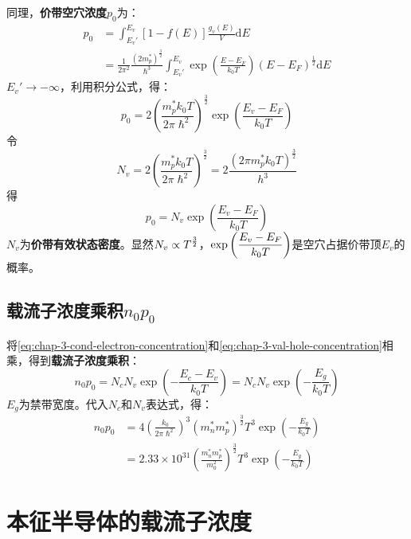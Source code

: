 同理，\textbf{价带空穴浓度}$p_0$为：
\begin{align}
    p_0&=\int_{E_v'}^{E_v}\left[1-f(E)\right]\frac{g_v(E)}{V}\mathrm{d}E\\
    &=\frac{1}{2\pi^2}\frac{(2m_p^*)^\frac{3}{2}}{\hslash^3}\int_{E_v'}^{E_v}\exp{\left(\frac{E-E_F}{k_0T}\right)}\left(E-E_F\right)^\frac{1}{2}\mathrm{d}E
\end{align}
$E_v'\rightarrow -\infty$，利用积分公式，得：
\begin{equation}
    p_0=2\left(\frac{m_p^* k_0T}{2\pi\hslash^2}\right)^\frac{3}{2}\exp{\left(\frac{E_v-E_F}{k_0T}\right)}
\end{equation}
令\begin{equation}
    N_v=2\left(\frac{m_p^* k_0T}{2\pi\hslash^2}\right)^\frac{3}{2}=2\frac{\left(2\pi m_p^*k_0T\right)^\frac{3}{2}}{h^3}
\end{equation}
得
\begin{equation}
    p_0=N_v\exp{\left(\frac{E_v-E_F}{k_0T}\right)}\label{eq:chap-3-val-hole-concentration}
\end{equation}
$N_v$为\textbf{价带有效状态密度}。显然$\displaystyle N_v\propto T^\frac{3}{2}$，$\displaystyle \exp{\left(\frac{E_v-E_F}{k_0T}\right)}$是空穴占据价带顶$E_v$的概率。

\subsection{载流子浓度乘积\texorpdfstring{$n_0p_0$}{n₀p₀}}

将\autoref{eq:chap-3-cond-electron-concentration}和\autoref{eq:chap-3-val-hole-concentration}相乘，得到\textbf{载流子浓度乘积}：
\begin{equation}
    n_0p_0=N_cN_v\exp{\left(-\frac{E_c-E_v}{k_0T}\right)}=N_cN_v\exp{\left(-\frac{E_g}{k_0T}\right)}\label{eq:chap-3-charge-carrier-concentration-production}
\end{equation}
$E_g$为禁带宽度。代入$N_c$和$N_v$表达式，得：
\begin{align}
    n_0p_0&=4\left(\frac{k_0}{2\pi\hslash^2}\right)^3\left(m_n^*m_p^*\right)^\frac{3}{2}T^3\exp{\left(-\frac{E_g}{k_0T}\right)}\\
    &=2.33\times 10^{31}\left(\frac{m_n^*m_p^*}{m_0^2}\right)^\frac{3}{2}T^3\exp{\left(-\frac{E_g}{k_0T}\right)}
\end{align}

\section{本征半导体的载流子浓度}

